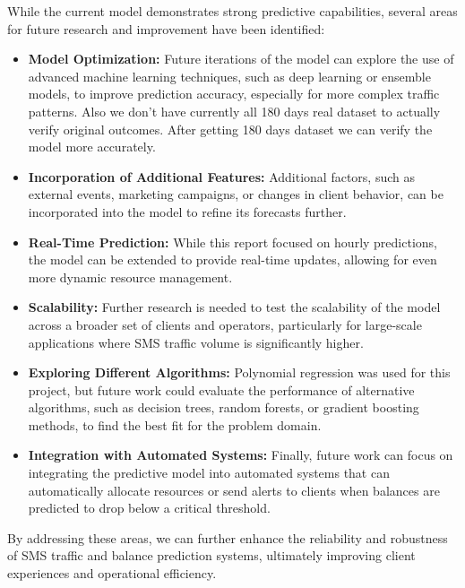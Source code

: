 \documentclass[12pt]{book} %
\begin{document}
While the current model demonstrates strong predictive capabilities, several areas for future research and improvement have been identified:

\begin{itemize}
    
    \item \textbf{Model Optimization:} Future iterations of the model can explore the use of advanced machine learning techniques, such as deep learning or ensemble models, to improve prediction accuracy, especially for more complex traffic patterns. Also we don't have currently all 180 days real dataset to actually verify original outcomes. After getting 180 days dataset we can verify the model more accurately.
    \item \textbf{Incorporation of Additional Features:} Additional factors, such as external events, marketing campaigns, or changes in client behavior, can be incorporated into the model to refine its forecasts further.
    \item \textbf{Real-Time Prediction:} While this report focused on hourly predictions, the model can be extended to provide real-time updates, allowing for even more dynamic resource management.
    \item \textbf{Scalability:} Further research is needed to test the scalability of the model across a broader set of clients and operators, particularly for large-scale applications where SMS traffic volume is significantly higher.
    \item \textbf{Exploring Different Algorithms:} Polynomial regression was used for this project, but future work could evaluate the performance of alternative algorithms, such as decision trees, random forests, or gradient boosting methods, to find the best fit for the problem domain.
    \item \textbf{Integration with Automated Systems:} Finally, future work can focus on integrating the predictive model into automated systems that can automatically allocate resources or send alerts to clients when balances are predicted to drop below a critical threshold.
\end{itemize}

By addressing these areas, we can further enhance the reliability and robustness of SMS traffic and balance prediction systems, ultimately improving client experiences and operational efficiency.
\end{document}
